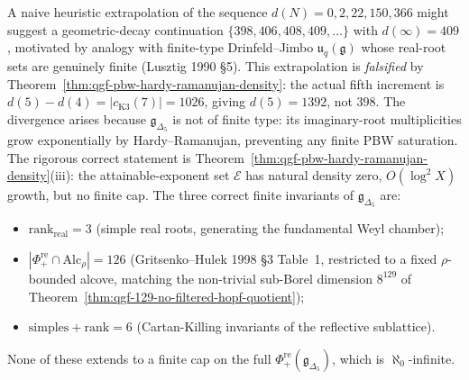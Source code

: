 \begin{remark}
\label{rem:qgf-pbw-no-finite-plateau}
A naive heuristic extrapolation of the sequence
$d(N) = 0, 2, 22, 150, 366$ might suggest a geometric-decay continuation
$\{398, 406, 408, 409, \dots\}$ with $d(\infty) = 409$, motivated by
analogy with finite-type Drinfeld--Jimbo $\mathfrak u_q(\mathfrak g)$
whose real-root sets are genuinely finite (Lusztig 1990 \S5). This
extrapolation is \emph{falsified} by
Theorem~\ref{thm:qgf-pbw-hardy-ramanujan-density}: the actual fifth
increment is $d(5) - d(4) = |c_{\mathrm K3}(7)| = 1026$, giving
$d(5) = 1392$, not $398$. The divergence arises because
$\mathfrak g_{\Delta_5}$ is not of finite type: its imaginary-root
multiplicities grow exponentially by Hardy--Ramanujan, preventing
any finite PBW saturation. The rigorous correct statement is
Theorem~\ref{thm:qgf-pbw-hardy-ramanujan-density}(iii): the
attainable-exponent set $\mathcal E$ has natural density zero,
$O(\log^2 X)$ growth, but no finite cap. The three correct finite
invariants of $\mathfrak g_{\Delta_5}$ are:
\begin{itemize}
 \item $\mathrm{rank}_{\mathrm{real}} = 3$ (simple real roots,
 generating the fundamental Weyl chamber);
 \item $|\Phi^{\mathrm{re}}_+\cap\mathrm{Alc}_\rho| = 126$
 (Gritsenko--Hulek 1998 \S3 Table~1, restricted to a fixed
 $\rho$-bounded alcove, matching the non-trivial sub-Borel
 dimension $8^{129}$ of Theorem~\ref{thm:qgf-129-no-filtered-hopf-quotient});
 \item $\mathrm{simples} + \mathrm{rank} = 6$
 (Cartan-Killing invariants of the reflective sublattice).
\end{itemize}
None of these extends to a finite cap on the full
$\Phi^{\mathrm{re}}_+(\mathfrak g_{\Delta_5})$, which is
$\aleph_0$-infinite.
\end{remark}

